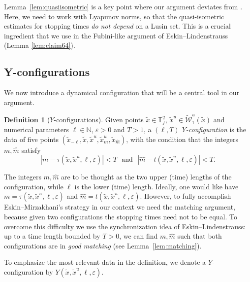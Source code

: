 \documentclass[a4paper,11pt,reqno]{amsart}
\newcommand{\N}{{\mathbb N}}
\newcommand{\TTf}{{\mathbb{T}_f^2}}
\newcommand{\cW}{{\mathcal W}}
\newcommand{\eps}{\varepsilon}
\newcommand{\tix}{\tilde{x}}
\newcommand{\w}{\widetilde{\cW}}
\theoremstyle{definition}
\newtheorem{definition}[theorem]{Definition}
\begin{document}
Lemma~\ref{lem:quasiisometric} is a key point where our argument deviates from \cite{ALOS}. Here, we need to work with Lyapunov norms, so that the quasi-isometric estimates for stopping times \emph{do not depend} on a Lusin set. This is a crucial ingredient that we use in the Fubini-like argument of Eskin--Lindenstrauss (Lemma \ref{lem:claim64}).  

\subsection{Y-configurations}
\label{sec:Y-config}

We now introduce a dynamical configuration that will be a central tool in our argument. 

\begin{definition}[$Y$-configurations]
Given points $\tix\in\TTf$, $\tix^u\in\w^u_1(\tix)$ and numerical parameters $\ell\in\N$, $\eps>0$ and $T>1$, a \textit{$(\ell,T)$ $Y$-configuration} is the data of five points $(\tix_{-\ell},\tix,\tix^u,\tix^u_m,\tix_{\hat{m}})$, with the condition that the integers $m,\hat{m}$ satisfy
\[
|m-\tau(\tix,\tix^u,\ell,\eps)|<T\:\:\:\textrm{and}\:\:\:|\hat{m}-t(\tix,\tix^u,\ell,\eps)|<T.
\]
\end{definition}

The integers $m,\hat{m}$ are to be thought as the two upper (time) lengths of the configuration, while $\ell$ is the lower (time) length. Ideally, one would like have
$m=\tau(\tix,\tix^u,\ell,\eps)$ and $\hat{m}=t(\tix,\tix^u,\ell,\eps)$. However, to fully accomplish Eskin--Mirzakhani's strategy in our context we need the matching argument, because given two configurations the stopping times need not to be equal. To overcome this difficulty we use the synchronization idea of Eskin--Lindenstrauss: up to a time length bounded by $T>0$, we can find $m,\hat{m}$ such that both configurations are in \emph{good matching} (see Lemma~\ref{lem:matching}).


To emphasize the most relevant data in the definition, we denote a $Y$-configuration by $Y(\tix,\tix^u,\ell,\eps)$.
\end{document}
